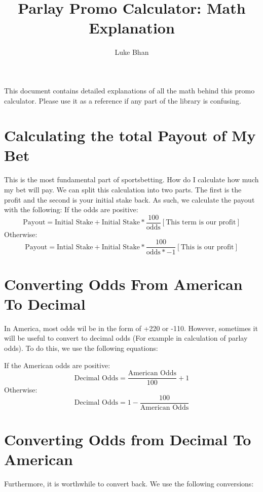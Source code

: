 \documentclass{article}
\title{Parlay Promo Calculator: Math Explanation}
\author{Luke Bhan}
\begin{document}
\maketitle
This document contains detailed explanations of all the math behind this promo calculator. Please use it as a reference if any part of the library is confusing.

\section{Calculating the total Payout of My Bet}
This is the most fundamental part of sportsbetting. How do I calculate how much my bet will pay. We can split this calculation into two parts. The first is the profit and the second is your initial stake back. 
As such, we calculate the payout with the following:
If the odds are positive:
\begin{equation}
  \textrm{Payout} = \textrm{Initial Stake} + \textrm{Initial Stake}*\frac{100}{\textrm{odds}} [\textrm{This term is our profit}]
\end{equation}
Otherwise:
\begin{equation}
  \textrm{Payout} = \textrm{Intial Stake} + \textrm{Initial Stake}*\frac{100}{\textrm{odds}*-1} [\textrm{This is our profit}]
\end{equation}

\section{Converting Odds From American To Decimal}
In America, most odds wil be in the form of +220 or -110. However, sometimes it will be useful to convert to decimal odds (For example in calculation of parlay odds). To do this, we use the following equations:

If the American odds are positive:
\begin{equation}
  \textrm{Decimal Odds} = \frac{\textrm{American Odds}}{100} + 1
\end{equation}
Otherwise:
\begin{equation}
  \textrm{Decimal Odds} = 1- \frac{100}{\textrm{American Odds}}
\end{equation}

\section{Converting Odds from Decimal To American}
Furthermore, it is worthwhile to convert back. We use the following conversions:
\end{document}

